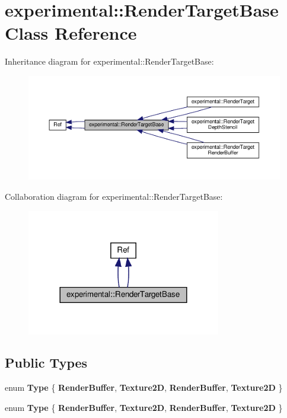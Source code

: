 \hypertarget{classexperimental_1_1RenderTargetBase}{}\section{experimental\+:\+:Render\+Target\+Base Class Reference}
\label{classexperimental_1_1RenderTargetBase}


Inheritance diagram for experimental\+:\+:Render\+Target\+Base\+:
\nopagebreak
\begin{figure}[H]
\begin{center}
\leavevmode
\includegraphics[width=350pt]{classexperimental_1_1RenderTargetBase__inherit__graph}
\end{center}
\end{figure}


Collaboration diagram for experimental\+:\+:Render\+Target\+Base\+:
\nopagebreak
\begin{figure}[H]
\begin{center}
\leavevmode
\includegraphics[width=240pt]{classexperimental_1_1RenderTargetBase__coll__graph}
\end{center}
\end{figure}
\subsection*{Public Types}
\begin{DoxyCompactItemize}
\item 
\mbox{\label{classexperimental_1_1RenderTargetBase_aaf9d3740fba4b248501207ab2ef92b90}} 
enum {\bfseries Type} \{ {\bfseries Render\+Buffer}, 
{\bfseries Texture2D}, 
{\bfseries Render\+Buffer}, 
{\bfseries Texture2D}
 \}
\item 
\mbox{\label{classexperimental_1_1RenderTargetBase_aaf9d3740fba4b248501207ab2ef92b90}} 
enum {\bfseries Type} \{ {\bfseries Render\+Buffer}, 
{\bfseries Texture2D}, 
{\bfseries Render\+Buffer}, 
{\bfseries Texture2D}
 \}
\end{DoxyCompactItemize}
